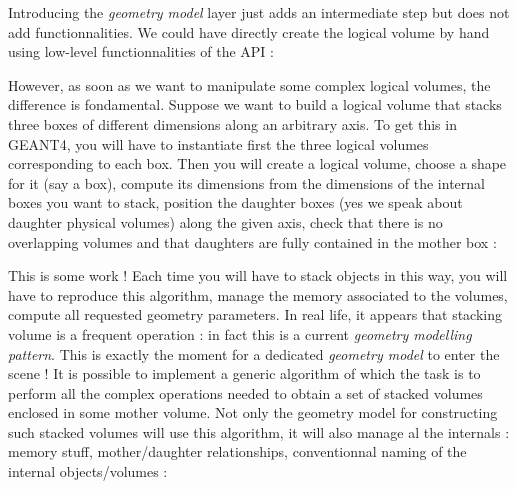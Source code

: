 \begin{center}
\scalebox{0.75}{}
\end{center}


\pn Introducing  the
\emph{geometry model} layer just adds  an intermediate step but does not
add functionnalities.  We could have directly create the logical 
volume by hand using low-level functionnalities of the API :

\begin{center}
\scalebox{0.75}{}
\end{center}

However, as soon  as we want to manipulate some
complex logical  volumes, the  difference is fondamental.   Suppose we
want to  build a logical volume  that stacks three  boxes of different
dimensions along  an arbitrary axis. To  get this in  GEANT4, you will
have to  instantiate first the three logical  volumes corresponding to
each box. Then you will create a logical volume, choose a shape for it
(say  a  box), compute  its  dimensions  from  the dimensions  of  the
internal boxes you want to  stack, position the daughter boxes (yes we
speak about daughter  physical volumes) along the given  axis, check that there
is no overlapping volumes and that daughters are fully contained in the
mother box :

\begin{center}
\scalebox{0.75}{}
\end{center}

This is some work ! Each time you will  have to stack objects in this way, you
will have to reproduce this algorithm, manage the memory associated to
the volumes, compute all  requested geometry parameters. In real life,
it appears  that stacking  volume is a  frequent operation :  in fact
this is a current  \emph{geometry modelling pattern}.  This is exactly
the moment for a dedicated  \emph{geometry model} to enter the scene !
It is possible  to implement a generic algorithm of  which the task is
to  perform all  the  complex operations  needed  to obtain  a set  of
stacked  volumes enclosed in  some mother  volume.  Not  only the geometry
model for constructing such stacked volumes  
will use this algorithm, it  will also
manage al  the internals  : memory stuff,  mother/daughter relationships,
conventionnal naming of the internal objects/volumes :

\begin{center}
\scalebox{0.75}{}
\end{center}


